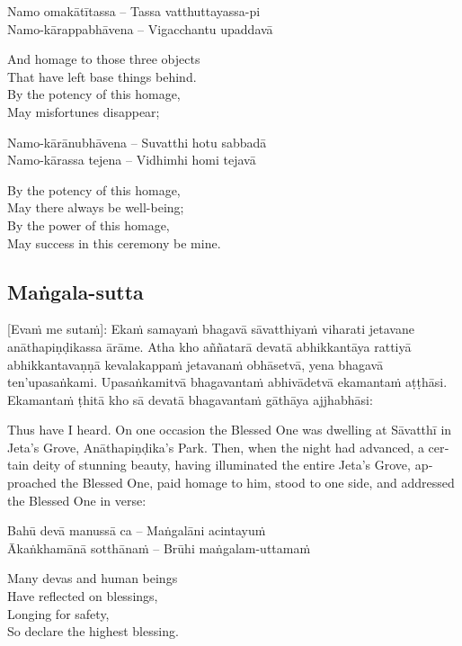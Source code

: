 Namo omakātītassa – Tassa vatthuttayassa-pi\\
Namo-kārappabhāvena – Vigacchantu upaddavā\\

\begin{english}
  And homage to those three objects\\
  That have left base things behind.\\
  By the potency of this homage,\\
  May misfortunes disappear;
\end{english}

Namo-kārānubhāvena – Suvatthi hotu sabbadā\\
Namo-kārassa tejena – Vidhimhi homi tejavā

\begin{english}
  By the potency of this homage,\\
  May there always be well-being;\\
  By the power of this homage,\\
  May success in this ceremony be mine.
\end{english}

\suttaRef{[Thai]}

\subsection{Maṅgala-sutta}
\label{mangala-sutta}
[Evaṁ me sutaṁ]: Ekaṁ samayaṁ bhagavā sāvatthiyaṁ viharati jetavane anāthapiṇḍikassa ārāme. Atha kho aññatarā devatā abhikkantāya rattiyā abhikkantavaṇṇā kevalakappaṁ jetavanaṁ obhāsetvā, yena bhagavā ten’upasaṅkami. Upasaṅkamitvā bhagavantaṁ abhivādetvā ekamantaṁ aṭṭhāsi. Ekamantaṁ ṭhitā kho sā devatā bhagavantaṁ gāthāya ajjhabhāsi:

\begin{english}
  Thus have I heard. On one occasion the Blessed One was dwelling at Sāvatthī in Jeta’s Grove, Anāthapiṇḍika’s Park. Then, when the night had advanced, a certain deity of stunning beauty, having illuminated the entire Jeta’s Grove, approached the Blessed One, paid homage to him, stood to one side, and addressed the Blessed One in verse:
\end{english}

Bahū devā manussā ca – Maṅgalāni acintayuṁ\\
Ākaṅkhamānā sotthānaṁ – Brūhi maṅgalam-uttamaṁ

\begin{english}
  Many devas and human beings\\
  Have reflected on blessings,\\
  Longing for safety,\\
  So declare the highest blessing.
\end{english}

